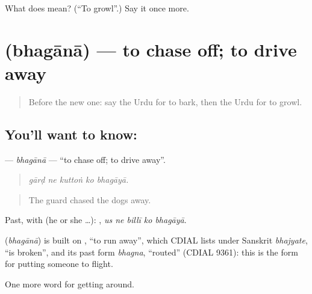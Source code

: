 \begin{tcolorbox}[breakable,colback=teal!4,colframe=teal!35!black,title={Before you move on}]
What does  mean? (\textquotedblleft{}To growl\textquotedblright{}.) Say it once more.
\end{tcolorbox}
\section[\texorpdfstring{\ur{بھگانا} (bhagānā)}{بھگانا (bhagānā)}]{ (bhagānā) — to chase off; to drive away}

\label{lesson:UR-C414-bhagana}



\begin{quote}
Before the new one: say the Urdu for to bark, then the Urdu for to growl.
\end{quote}

\subsection*{You'll want to know: }
\textbf{} — \emph{bhagānā} — \textquotedblleft{}to chase off; to drive away\textquotedblright{}.

\begin{quote}
    
\end{quote}

\begin{quote}
\emph{gārḍ ne kuttoṅ ko bhagāyā.}
\end{quote}

\begin{quote}
The guard chased the dogs away.
\end{quote}

Past, with  (he or she …):     , \emph{us ne billī ko bhagāyā}.

\begin{cousinweb}
\textbf{} (\emph{bhagānā}) is built on \textbf{}, \textquotedblleft{}to run away\textquotedblright{}, which CDIAL lists under Sanskrit \emph{bhajyate}, \textquotedblleft{}is broken\textquotedblright{}, and its past form \emph{bhagna}, \textquotedblleft{}routed\textquotedblright{} (CDIAL 9361): this is the form for putting someone to flight.
\end{cousinweb}

\begin{grammarlens}[title={What you've built}]
One more word for getting around.
\end{grammarlens}

